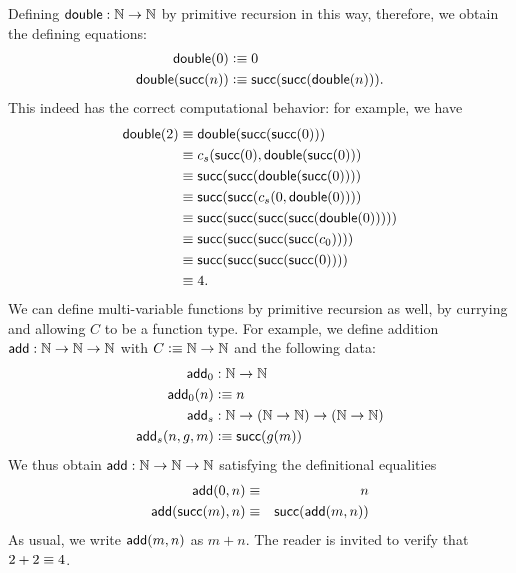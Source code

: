 Defining $\mathsf{double}:\mathbb{N}\to\mathbb{N}$ by primitive recursion in this way, therefore, we obtain the defining equations:
\begin{align*}
  \mathsf{double}(0) &\vcentcolon\equiv 0\\
  \mathsf{double}(\mathsf{succ}(n)) &\vcentcolon\equiv \mathsf{succ}(\mathsf{succ}(\mathsf{double}(n))).
\end{align*}
This indeed has the correct computational behavior: for example, we have 
\begin{align*}
  \mathsf{double}(2) &\equiv \mathsf{double}(\mathsf{succ}(\mathsf{succ}(0)))\\
  & \equiv c_s(\mathsf{succ}(0), \mathsf{double}(\mathsf{succ}(0))) \\
                 & \equiv \mathsf{succ}(\mathsf{succ}(\mathsf{double}(\mathsf{succ}(0)))) \\
                 & \equiv \mathsf{succ}(\mathsf{succ}(c_s(0,\mathsf{double}(0)))) \\
                 & \equiv \mathsf{succ}(\mathsf{succ}(\mathsf{succ}(\mathsf{succ}(\mathsf{double}(0))))) \\
                 & \equiv \mathsf{succ}(\mathsf{succ}(\mathsf{succ}(\mathsf{succ}(c_0)))) \\
                 & \equiv \mathsf{succ}(\mathsf{succ}(\mathsf{succ}(\mathsf{succ}(0))))\\
                 &\equiv 4.
\end{align*}
We can define multi-variable functions by primitive recursion as well, by currying and allowing $C$ to be a function type.
For example, we define addition $\mathsf{add} : \mathbb{N} \to \mathbb{N} \to \mathbb{N}$ with $C \vcentcolon\equiv \mathbb{N} \to \mathbb{N}$ and the following data:
\begin{align*}
  \mathsf{add}_0 & : \mathbb{N} \to \mathbb{N} \\
  \mathsf{add}_0 (n) & \vcentcolon\equiv n \\
  \mathsf{add}_s & : \mathbb{N} \to (\mathbb{N} \to \mathbb{N}) \to (\mathbb{N} \to \mathbb{N}) \\
  \mathsf{add}_s(n,g,m) & \vcentcolon\equiv \mathsf{succ}(g(m))
\end{align*}
We thus obtain $\mathsf{add} : \mathbb{N} \to \mathbb{N} \to \mathbb{N}$ satisfying the definitional equalities
\begin{eqnarray*}
  \mathsf{add}(0,n) & \equiv & n \\
  \mathsf{add}(\mathsf{succ}(m),n) & \equiv & \mathsf{succ}(\mathsf{add}(m,n)) 
\end{eqnarray*}
As usual, we write $\mathsf{add}(m,n)$ as $m+n$.
The reader is invited to verify that $2+2\equiv 4$.

